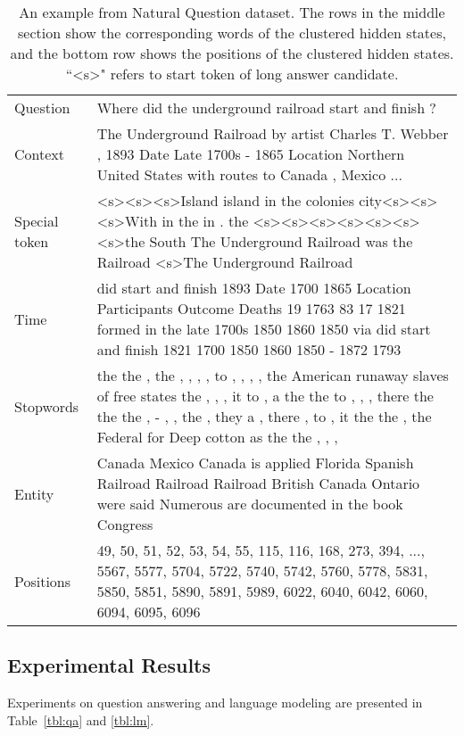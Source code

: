 \documentclass[11pt,a4paper]{article}
\begin{document}
\begin{table*}[]
\small
\begin{tabular}{lp{13cm}}
\toprule
Question         & Where did the underground railroad start and finish ?\\
Context & The Underground Railroad by artist Charles T. Webber , 1893 Date Late 1700s - 1865 Location Northern United States with routes to Canada , Mexico ...\\
\midrule
Special token & \textless{}s\textgreater \textless{}s\textgreater \textless{}s\textgreater Island island in the colonies city\textless{}s\textgreater \textless{}s\textgreater \textless{}s\textgreater With in the in . the \textless{}s\textgreater \textless{}s\textgreater \textless{}s\textgreater \textless{}s\textgreater \textless{}s\textgreater \textless{}s\textgreater \textless{}s\textgreater the South The Underground Railroad was the Railroad \textless{}s\textgreater The Underground Railroad   \\
Time & did start and finish 1893 Date 1700 1865 Location Participants Outcome Deaths 19 1763 83 17 1821 formed in the late 1700s  1850 1860 1850 via did start and finish 1821 1700 1850 1860 1850 - 1872 1793      \\
Stopwords & the the , the , , , , to , , , , the American runaway slaves of free states the , , , it to , a the the to , , , there the the the , - , , the , they a , there , to , it the the , the Federal for Deep cotton as the the , , , \\
Entity & Canada Mexico Canada is applied Florida Spanish Railroad Railroad Railroad British Canada Ontario were said Numerous are documented in the book  Congress  \\
\midrule
Positions         &   49, 50, 51, 52, 53, 54, 55, 115, 116, 168, 273, 394, ..., 5567, 5577, 5704, 5722, 5740, 5742, 5760, 5778, 5831, 5850, 5851, 5890, 5891, 5989, 6022, 6040, 6042, 6060, 6094, 6095, 6096\\
\bottomrule
\end{tabular}
\vspace{-0.1cm}
\caption{An example from Natural Question dataset. The rows in the middle section show the corresponding words of the clustered hidden states, and the bottom row shows the positions of the clustered hidden states. ``\textless{}s\textgreater"  refers to start token of long answer candidate.}
\label{tbl:cluster}
\vspace{-0.4cm}
\end{table*}
\subsection{Experimental Results}
Experiments on question answering and language modeling are presented in Table~\ref{tbl:qa} and \ref{tbl:lm}.
\end{document}
